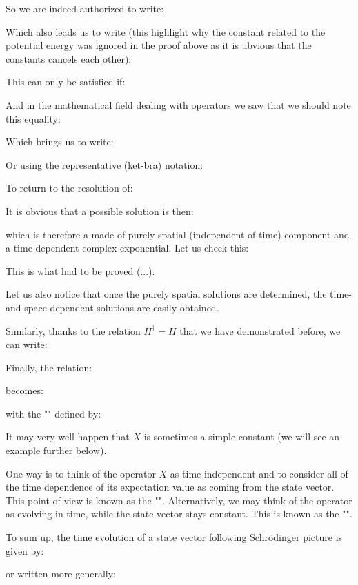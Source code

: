 	So we are indeed authorized to write:
	
	Which also leads us to write (this highlight why the constant related to the potential energy was ignored in the proof above as it is ubvious that the constants cancels each other):
	
	This can only be satisfied if:
	
	And in the mathematical field dealing with operators we saw that we should note this equality:
	
	Which brings us to write:
	
	Or using the representative (ket-bra) notation:
	
	To return to the resolution of:
	
	It is obvious that a possible solution is then:
	
	which is therefore a made of purely spatial (independent of time) component and a time-dependent complex exponential. Let us check this:
	
	This is what had to be proved (...).

	Let us also notice that once the purely spatial solutions are determined, the time- and space-dependent solutions are easily obtained.
	
	Similarly, thanks to the relation $H^\dagger=H$ that we have demonstrated before, we can write:
	
	Finally, the relation:
	
	becomes:
	
	with the "" defined by:
	
	\begin{tcolorbox}[title=Remark,colframe=black,arc=10pt]
	It may very well happen that $X$ is sometimes a simple constant (we will see an example further below).
	\end{tcolorbox}
	 One way is to think of the operator $X$ as time-independent and to consider all of the time dependence of its expectation value as coming from the state vector. This point of view is known as the "". Alternatively, we may think of the operator as evolving in time, while the state vector stays constant. This is known as the "". 
	 
	 To sum up, the time evolution of a state vector following Schrödinger picture is given by:
	
	or written more generally:
	
